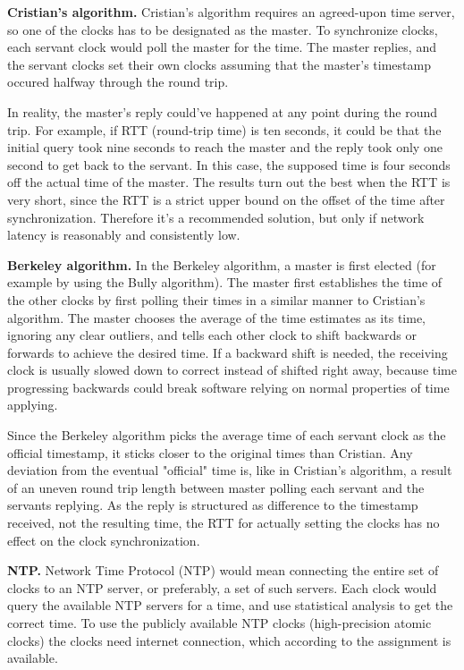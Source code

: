 \documentclass[12pt,a4paper,titlepage]{article}
\begin{document}
\textbf{Cristian's algorithm.} Cristian's algorithm requires an agreed-upon time server, so one of the clocks has to be designated as the master. To synchronize clocks, each servant clock would poll the master for the time. The master replies, and the servant clocks set their own clocks assuming that the master's timestamp occured halfway through the round trip.

In reality, the master's reply could've happened at any point during the round trip. For example, if RTT (round-trip time) is ten seconds, it could be that the initial query took nine seconds to reach the master and the reply took only one second to get back to the servant. In this case, the supposed time is four seconds off the actual time of the master. The results turn out the best when the RTT is very short, since the RTT is a strict upper bound on the offset of the time after synchronization. Therefore it's a recommended solution, but only if network latency is reasonably and consistently low.

\textbf{Berkeley algorithm.} In the Berkeley algorithm, a master is first elected (for example by using the Bully algorithm). The master first establishes the time of the other clocks by first polling their times in a similar manner to Cristian's algorithm. The master chooses the average of the time estimates as its time, ignoring any clear outliers, and tells each other clock to shift backwards or forwards to achieve the desired time. If a backward shift is needed, the receiving clock is usually slowed down to correct instead of shifted right away, because time progressing backwards could break software relying on normal properties of time applying.

Since the Berkeley algorithm picks the average time of each servant clock as the official timestamp, it sticks closer to the original times than Cristian. Any deviation from the eventual "official" time is, like in Cristian's algorithm, a result of an uneven round trip length between master polling each servant and the servants replying. As the reply is structured as difference to the timestamp received, not the resulting time, the RTT for actually setting the clocks has no effect on the clock synchronization.

\textbf{NTP.} Network Time Protocol (NTP) would mean connecting the entire set of clocks to an NTP server, or preferably, a set of such servers. Each clock would query the available NTP servers for a time, and use statistical analysis to get the correct time. To use the publicly available NTP clocks (high-precision atomic clocks) the clocks need internet connection, which according to the assignment is available.
\end{document}
